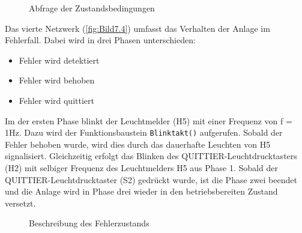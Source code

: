 \begin{figure}[H]
   \centering
   \caption[Abfrage der Zustandsbedingungen]{Abfrage der Zustandsbedingungen}
   \label{fig:Bild7.3}
\end{figure}

Das vierte Netzwerk (\autoref{fig:Bild7.4}) umfasst das Verhalten der Anlage im Fehlerfall. Dabei wird in drei Phasen unterschieden:
\begin{itemize}
    \item Fehler wird detektiert
    \item Fehler wird behoben
    \item Fehler wird quittiert
\end{itemize}

Im der ersten Phase blinkt der Leuchtmelder (H5) mit einer Frequenz von f = 1Hz. Dazu wird der Funktionsbaustein \texttt{Blinktakt()} aufgerufen. Sobald der Fehler behoben wurde, wird dies durch das dauerhafte Leuchten von H5 signalisiert. Gleichzeitig erfolgt das Blinken des QUITTIER-Leuchtdrucktasters (H2) mit selbiger Frequenz des Leuchtmelders H5 aus Phase 1. Sobald der QUITTIER-Leuchtdrucktaster (S2) gedrückt wurde, ist die Phase zwei beendet und die Anlage wird in Phase drei wieder in den betriebsbereiten Zustand versetzt.

\begin{figure}[H]
   \centering
   \caption[Beschreibung des Fehlerzustands]{Beschreibung des Fehlerzustands}
   \label{fig:Bild7.4}
\end{figure}

